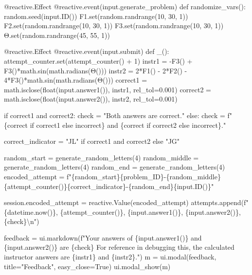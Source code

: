\documentclass[
  letterpaper,
  DIV=11,
  numbers=noendperiod]{scrreprt}
\newenvironment{Shaded}{\begin{snugshade}}{\end{snugshade}}
\newcommand{\NormalTok}[1]{\textcolor[rgb]{0.00,0.23,0.31}{#1}}
\begin{document}
\begin{Shaded}
\begin{Highlighting}[]
\NormalTok{    @reactive.Effect}
\NormalTok{    @reactive.event(input.generate\_problem)}
\NormalTok{    def randomize\_vars():}
\NormalTok{        random.seed(input.ID())}
\NormalTok{        F1.set(random.randrange(10, 30, 1))}
\NormalTok{        F2.set(random.randrange(10, 30, 1))}
\NormalTok{        F3.set(random.randrange(10, 30, 1))}
\NormalTok{        Θ.set(random.randrange(45, 55, 1))}

\NormalTok{    @reactive.Effect}
\NormalTok{    @reactive.event(input.submit)}
\NormalTok{    def \_():}
\NormalTok{        attempt\_counter.set(attempt\_counter() + 1)}
\NormalTok{        instr1 = {-}F3() + F3()*math.sin(math.radians(Θ()))}
\NormalTok{        instr2 = 2*F1() {-} 2*F2() {-} 4*F3()*math.sin(math.radians(Θ()))}
\NormalTok{        correct1 = math.isclose(float(input.answer1()), instr1, rel\_tol=0.001)}
\NormalTok{        correct2 = math.isclose(float(input.answer2()), instr2, rel\_tol=0.001)}
        
\NormalTok{        if correct1 and correct2:}
\NormalTok{            check = "Both answers are correct."}
\NormalTok{        else:}
\NormalTok{            check = f" \{\textquotesingle{}correct\textquotesingle{} if correct1 else \textquotesingle{}incorrect\textquotesingle{}\} and \{\textquotesingle{}correct\textquotesingle{} if correct2 else \textquotesingle{}incorrect\textquotesingle{}\}."}
        
\NormalTok{        correct\_indicator = "JL" if correct1 and correct2 else "JG"}

\NormalTok{        random\_start = generate\_random\_letters(4)}
\NormalTok{        random\_middle = generate\_random\_letters(4)}
\NormalTok{        random\_end = generate\_random\_letters(4)}
\NormalTok{        encoded\_attempt = f"\{random\_start\}\{problem\_ID\}{-}\{random\_middle\}\{attempt\_counter()\}\{correct\_indicator\}{-}\{random\_end\}\{input.ID()\}"}

\NormalTok{        session.encoded\_attempt = reactive.Value(encoded\_attempt)}
\NormalTok{        attempts.append(f"\{datetime.now()\}, \{attempt\_counter()\}, \{input.answer1()\}, \{input.answer2()\}, \{check\}\textbackslash{}n")}

\NormalTok{        feedback = ui.markdown(f"Your answers of \{input.answer1()\} and \{input.answer2()\} are \{check\} For reference in debugging this, the calculated instructor answers are \{instr1\} and \{instr2\}.")}
\NormalTok{        m = ui.modal(feedback, title="Feedback", easy\_close=True)}
\NormalTok{        ui.modal\_show(m)}


\end{Highlighting}
\end{Shaded}
\end{document}
